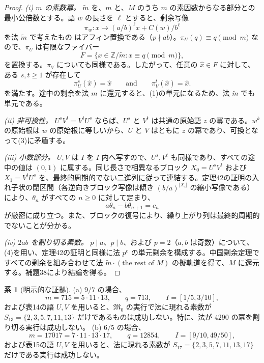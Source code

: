 \documentclass[11pt,reqno]{amsart}
\theoremstyle{definition}
\newtheorem{corollary}[theorem]{系}
\theoremstyle{definition}
\theoremstyle{remark}
\begin{document}
\begin{proof}\leavevmode\label{proof:69}
\emph{(i) \(m\) の素数冪。} \(\tilde m\) を、\(m\) と、\(M\) のうち \(m\) の素因数からなる部分との最小公倍数とする。語 \(w\) の長さを \(\ell\) とすると、剰余写像
\[
\pi_w:x\mapsto(a/b)^\ell x+C(w)/b^\ell
\]
を法 \(\tilde m\) で考えたもの
はアフィン置換である（\(p\nmid ab\)）。\(\pi_U(q)\equiv q\pmod m\) なので、\(\pi_U\) は有限なファイバー
\[
F=\{x\in\mathbb Z/\tilde m:x\equiv q\pmod m\},
\]
を置換する。\(\pi_V\) についても同様である。したがって、任意の \(\hat x\in F\) に対して、ある \(s,t\ge1\) が存在して
\[
\pi_U^s(\hat x)=\hat x\qquad \text{and}\qquad \pi_V^t(\hat x)=\hat x.
\]
を満たす。途中の剰余を法 \(m\) に還元すると、(1)の単元になるため、法 \(\tilde m\) でも単元である。

\emph{(ii) 非可換性。} \(U^sV^t=V^tU^s\) ならば、\(U^s\) と \(V^t\) は共通の原始語 \(z\) の冪である。\(w^k\) の原始根は \(w\) の原始根に等しいから、\(U\) と \(V\) はともに \(z\) の冪であり、可換となって(3)に矛盾する。

\emph{(iii) 小数部分。} \(U,V\) は \(I\) を \(I\) 内へ写すので、\(U^s,V^t\) も同様であり、すべての途中の値は \((0,1)\) に属する。同じ長さで相異なるブロック \(X_0=U^sV^t\) および \(X_1=V^tU^s\) を、最終的周期的でない二進列に従って連結する。定理42の証明の入れ子状の閉区間（各逆向きブロック写像は傾き \((b/a)^{|X_i|}\) の縮小写像である）により、\(\theta_n\) がすべての \(n\ge0\) に対して定まり、
\[
a\theta_n-b\theta_{n+1}=c_n
\]
が厳密に成り立つ。また、ブロックの復号により、繰り上がり列は最終的周期的でないことが分かる。

\emph{(iv) \(2ab\) を割り切る素数。} \(p\mid a\)、\(p\mid b\)、および \(p=2\)（\(a,b\) は奇数）について、(4)を用い、定理42の証明と同様に法 \(p^e\) の単元剰余を構成する。中国剰余定理ですべての剰余を組み合わせて法 \(\tilde m\cdot(\text{the
rest of }M)\) の擬軌道を得て、\(M\) に還元する。補題38により結論を得る。\qedhere
\end{proof}

\begin{samepage}
\begin{corollary}[明示的な証拠]\leavevmode\label{thm:70}
(a) \(9/7\) の場合、
\[
m=715=5\cdot11\cdot13,\qquad q=713,\qquad I=[1/5,3/10],
\]
および表14の語 \(U,V\) を用いると、\(\mathfrak M_0\) の実行で法に現れる素数が \(S_{13}=\{2,3,5,7,11,13\}\) だけであるものは成功しない。特に、法が \(4290\) の冪を割り切る実行は成功しない。
(b) \(6/5\) の場合、
\[
m=17017=7\cdot11\cdot13\cdot17,\qquad q=12854,\qquad I=[9/10,49/50],
\]
および表15の語 \(U,V\) を用いると、法に現れる素数が
\(S_{17}=\{2,3,5,7,11,13,17\}\) だけである実行は成功しない。
\label{thm-end:70}
\end{corollary}
\end{samepage}
\end{document}
